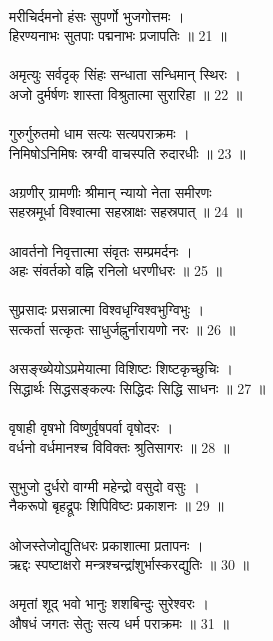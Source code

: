 \subsubsection{}
\\
मरीचिर्दमनो हंसः सुपर्णो भुजगोत्तमः ।\\
हिरण्यनाभः सुतपाः पद्मनाभः प्रजापतिः ॥ 21 ॥\\
\\
अमृत्युः सर्वदृक् सिंहः सन्धाता सन्धिमान् स्थिरः ।\\
अजो दुर्मर्षणः शास्ता विश्रुतात्मा सुरारिहा ॥ 22 ॥\\
\\
गुरुर्गुरुतमो धाम सत्यः सत्यपराक्रमः ।\\
निमिषोऽनिमिषः स्रग्वी वाचस्पति रुदारधीः ॥ 23 ॥\\
\\
अग्रणीर् ग्रामणीः श्रीमान् न्यायो नेता समीरणः\\
सहस्रमूर्धा विश्वात्मा सहस्राक्षः सहस्रपात् ॥ 24 ॥\\
\\
आवर्तनो निवृत्तात्मा संवृतः सम्प्रमर्दनः ।\\
अहः संवर्तको वह्नि रनिलो धरणीधरः ॥ 25 ॥\\
\\
सुप्रसादः प्रसन्नात्मा विश्वधृग्विश्वभुग्विभुः ।\\
सत्कर्ता सत्कृतः साधुर्जह्नुर्नारायणो नरः ॥ 26 ॥\\
\\
असङ्ख्येयोऽप्रमेयात्मा विशिष्टः शिष्टकृच्छुचिः ।\\
सिद्धार्थः सिद्धसङ्कल्पः सिद्धिदः सिद्धि साधनः ॥ 27 ॥\\
\\
वृषाही वृषभो विष्णुर्वृषपर्वा वृषोदरः ।\\
वर्धनो वर्धमानश्च विविक्तः श्रुतिसागरः ॥ 28 ॥\\
\\
सुभुजो दुर्धरो वाग्मी महेन्द्रो वसुदो वसुः ।\\
नैकरूपो बृहद्रूपः शिपिविष्टः प्रकाशनः ॥ 29 ॥\\
\\
ओजस्तेजोद्युतिधरः प्रकाशात्मा प्रतापनः ।\\
ऋद्दः स्पष्टाक्षरो मन्त्रश्चन्द्रांशुर्भास्करद्युतिः ॥ 30 ॥\\
\\
अमृतां शूद् भवो भानुः शशबिन्दुः सुरेश्वरः ।\\
औषधं जगतः सेतुः सत्य धर्म पराक्रमः ॥ 31 ॥\\
